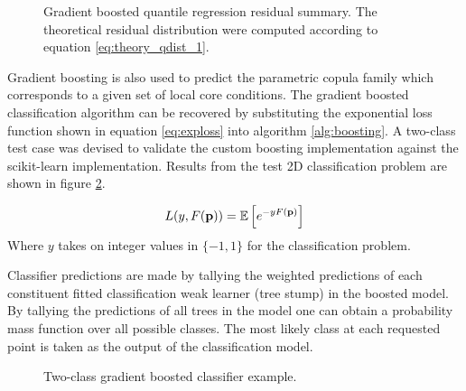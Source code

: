 \begin{figure}[H]%
    \centering
    \qquad
    \qquad
    \qquad
    \qquad
    \caption[Gradient boosted quantile regression residual summary.]{Gradient boosted quantile regression residual summary.  The theoretical residual distribution were computed according to equation \ref{eq:theory_qdist_1}.} %
    \label{fig:gb2}%
\end{figure}

Gradient boosting is also used to predict the parametric copula family which corresponds to a given set of local core conditions.  The gradient boosted classification algorithm can be recovered by substituting the exponential loss function shown in equation \ref{eq:exploss} into algorithm \ref{alg:boosting}.   A two-class test case was devised to validate the custom boosting implementation against the scikit-learn implementation.  Results from the test 2D classification problem are shown in figure \ref{fig:gb3}.

\begin{equation}
L(y, F(\mathbf p)) = \operatorname*{\mathbb{E}} \left[ e^{-yF(\mathbf p)}\right]
\label{eq:exploss}
\end{equation}
Where $y$ takes on integer values in $\{-1, 1\}$ for the classification problem.

Classifier predictions are made by tallying the weighted predictions of each constituent fitted classification weak learner (tree stump) in the boosted model.  By tallying the predictions of all trees in the model one can obtain a probability mass function over all possible classes.  The most likely class at each requested point is taken as the output of the classification model.

\begin{figure}[H]%
    \centering
    \qquad
    \caption{Two-class gradient boosted classifier example.}%
    \label{fig:gb3}%
\end{figure}

